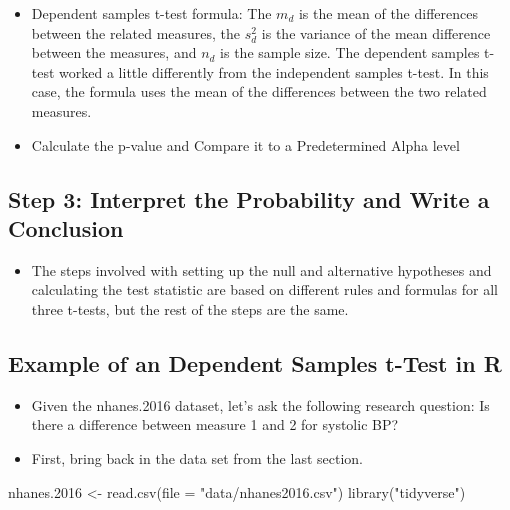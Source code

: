 \documentclass[
  letterpaper,
  DIV=11,
  numbers=noendperiod]{scrreprt}
\newenvironment{Shaded}{\begin{snugshade}}{\end{snugshade}}
\newcommand{\AttributeTok}[1]{\textcolor[rgb]{0.40,0.45,0.13}{#1}}
\newcommand{\FloatTok}[1]{\textcolor[rgb]{0.68,0.00,0.00}{#1}}
\newcommand{\FunctionTok}[1]{\textcolor[rgb]{0.28,0.35,0.67}{#1}}
\newcommand{\NormalTok}[1]{\textcolor[rgb]{0.00,0.23,0.31}{#1}}
\newcommand{\OtherTok}[1]{\textcolor[rgb]{0.00,0.23,0.31}{#1}}
\newcommand{\StringTok}[1]{\textcolor[rgb]{0.13,0.47,0.30}{#1}}
\providecommand{\tightlist}{%
  \setlength{\itemsep}{0pt}\setlength{\parskip}{0pt}}\usepackage{longtable,booktabs,array}
\begin{document}
\begin{itemize}
\item
  Dependent samples t-test formula: The \(m_d\) is the mean of the
  differences between the related measures, the \(s^2_d\) is the
  variance of the mean difference between the measures, and \(n_d\) is
  the sample size. The dependent samples t-test worked a little
  differently from the independent samples t-test. In this case, the
  formula uses the mean of the differences between the two related
  measures.
\item
  Calculate the p-value and Compare it to a Predetermined Alpha level
\end{itemize}

\subsection{Step 3: Interpret the Probability and Write a
Conclusion}\label{step-3-interpret-the-probability-and-write-a-conclusion-1}

\begin{itemize}
\tightlist
\item
  The steps involved with setting up the null and alternative hypotheses
  and calculating the test statistic are based on different rules and
  formulas for all three t-tests, but the rest of the steps are the
  same.
\end{itemize}

\subsection{Example of an Dependent Samples t-Test in
R}\label{example-of-an-dependent-samples-t-test-in-r}

\begin{itemize}
\item
  Given the nhanes.2016 dataset, let's ask the following research
  question: Is there a difference between measure 1 and 2 for systolic
  BP?
\item
  First, bring back in the data set from the last section.
\end{itemize}

\begin{Shaded}
\begin{Highlighting}[]
\NormalTok{nhanes}\FloatTok{.2016} \OtherTok{\textless{}{-}} \FunctionTok{read.csv}\NormalTok{(}\AttributeTok{file =} \StringTok{"data/nhanes2016.csv"}\NormalTok{)}
\FunctionTok{library}\NormalTok{(}\StringTok{"tidyverse"}\NormalTok{)}
\end{Highlighting}
\end{Shaded}
\end{document}
